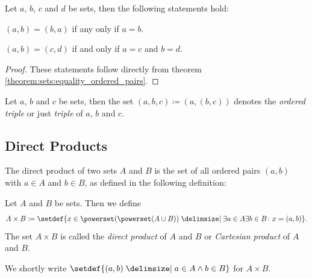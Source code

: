 \begin{theorem}
    Let $a$, $b$, $c$ and $d$ be sets, then the following statements hold:
    \begin{intheoremenumerate}
        \item $(a,b)=(b,a)$ if any only if $a=b$.
        \item $(a,b)=(c,d)$ if and only if $a=c$ and $b=d$.
    \end{intheoremenumerate}
\end{theorem}
\begin{proof}
    These statements follow directly from theorem \ref{theorem:sets:equality_ordered_pairs}.
\end{proof}

\begin{definition}
    Let $a$, $b$ and $c$ be sets, then the set $(a,b,c)\coloneq (a,(b,c))$ denotes the \emph{ordered triple} or just \emph{triple} of $a$, $b$ and $c$.
\end{definition}

\subsection{Direct Products}

The direct product of two sets $A$ and $B$ is the set of all ordered pairs $(a,b)$ with $a\in A$ and $b\in B$, as defined in the following definition:

\begin{definition}
    Let $A$ and $B$ be sets. Then we define \begin{align}A\times B\coloneq\setdef{x\in\powerset(\powerset(A\cup B))\given \exists a\in A\exists b\in B\colon x=(a,b)}.\end{align}
    The set $A\times B$ is called the \emph{direct product} of $A$ and $B$ or \emph{Cartesian product} of $A$ and $B$.

    We shortly write $\setdef{(a,b)\given a\in A\land b\in B}$ for $A\times B$.
\end{definition}

